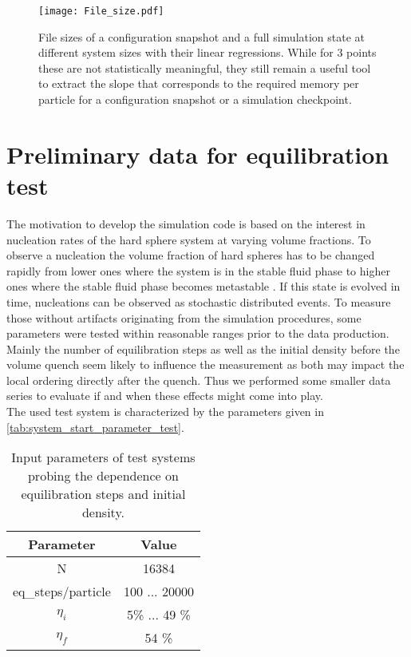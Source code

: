 \begin{figure}[h!]
\centering
\texttt{[image: File\_size.pdf]}
\caption[File size estimate]{File sizes of a configuration snapshot and a full simulation state at different system sizes with their linear regressions. While for 3 points these are not statistically meaningful, they still remain a useful tool to extract the slope that corresponds to the required memory per particle for a configuration snapshot or a simulation checkpoint.}
\label{fig:file_size}
\end{figure}

\section{Preliminary data for equilibration test}
\label{sec:data}
The motivation to develop the simulation code is based on the interest in nucleation rates of the hard sphere system at varying volume fractions. To observe a nucleation the volume fraction of hard spheres has to be changed rapidly from lower ones where the system is in the stable fluid phase to higher ones where the stable fluid phase becomes metastable . If this state is evolved in time, nucleations can be observed as stochastic distributed events. To measure those without artifacts originating from the simulation procedures, some parameters were tested within reasonable ranges prior to the data production.\\
Mainly the number of equilibration steps as well as the initial density before the volume quench seem likely to influence the measurement as both may impact the local ordering directly after the quench. Thus we performed some smaller data series to evaluate if and when these effects might come into play.\\
The used test system is characterized by the parameters given in \autoref{tab:system_start_parameter_test}.\\

\begin{table}
\centering
\begin{tabular}{c|c}
Parameter & Value \\ \hline
N & 16384 \\
eq\_steps/particle & 100 ... 20000 \\
$\eta_i$ & 5\% ... 49 \% \\
$\eta_f$ & 54 \% \\
\end{tabular}
\caption[Simulation parameters for testing equilibration step number and initial density]{Input parameters of test systems probing the dependence on equilibration steps and initial density.}
\label{tab:system_start_parameter_test}
\end{table}

